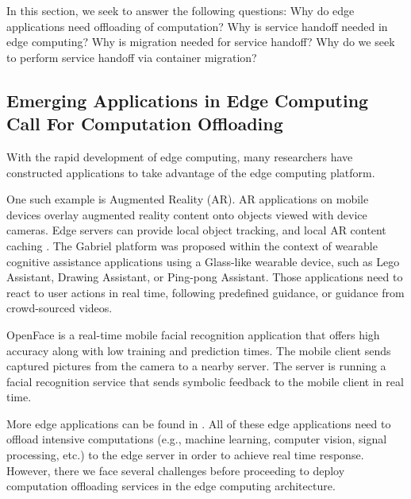 In this section, we seek to answer the following questions: Why do edge applications need offloading of computation? Why is service handoff needed in edge computing? Why is migration needed for service handoff? Why do we seek to perform service handoff via container migration?

\subsection{Emerging Applications in Edge Computing Call For Computation Offloading}

With the rapid development of edge computing, many researchers have constructed applications to take advantage of the edge computing platform. 

One such example is Augmented Reality (AR). AR applications on mobile devices overlay augmented reality content
onto objects viewed with device cameras. Edge servers can
provide local object tracking, and local AR content caching
\cite{satya2009case,MEC2014initiative,MEC2015-5G,hao2017challenges}.
%
The Gabriel platform \cite{ha2014wearable}  was proposed within the context of wearable cognitive assistance applications using a Glass-like wearable device, such as Lego Assistant, Drawing Assistant, or Ping-pong Assistant. 
Those applications need to react to user actions in real time, following predefined guidance, or guidance from crowd-sourced videos. 
%
%


OpenFace\cite{openface2016} is a real-time mobile facial recognition application that offers high accuracy along with low training and prediction times.  The mobile client sends captured pictures from the camera to a nearby server. The server is running a facial recognition service that sends symbolic feedback to the mobile client in real time.  


More edge applications can be found in \cite{yi2015fog,yi2015survey,satya2017edge}.
%
All of these edge applications need to offload intensive computations (e.g., machine learning, computer vision, signal processing, etc.) to the edge server in order to achieve real time response. However, there we face several challenges before proceeding to deploy computation offloading services in the edge computing architecture. 

